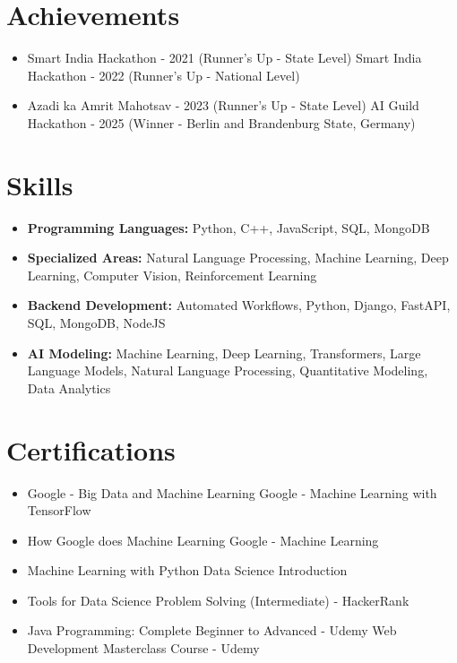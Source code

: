 \documentclass[a4paper,10pt]{article}
\begin{document}
\section*{Achievements}
\begin{itemize}
\item Smart India Hackathon - 2021 (Runner's Up - State Level) \hfill Smart India Hackathon - 2022 (Runner's Up - National Level)
\item Azadi ka Amrit Mahotsav - 2023 (Runner's Up - State Level) \hfill AI Guild Hackathon - 2025 (Winner - Berlin and Brandenburg State, Germany)
\end{itemize}

\section*{Skills}
\begin{itemize}
  \item \textbf{Programming Languages:} Python, C++, JavaScript, SQL, MongoDB
  \item \textbf{Specialized Areas:} Natural Language Processing, Machine Learning, Deep Learning, Computer Vision, Reinforcement Learning
  \item \textbf{Backend Development:} Automated Workflows, Python, Django, FastAPI, SQL, MongoDB, NodeJS
  \item \textbf{AI Modeling:} Machine Learning, Deep Learning, Transformers, Large Language Models, Natural Language Processing, Quantitative Modeling, Data Analytics
\end{itemize}

\section*{Certifications}
\begin{itemize}
\item Google - Big Data and Machine Learning \hfill Google - Machine Learning with TensorFlow
\item How Google does Machine Learning \hfill Google - Machine Learning
\item Machine Learning with Python \hfill Data Science Introduction
\item Tools for Data Science \hfill Problem Solving (Intermediate) - HackerRank
\item Java Programming: Complete Beginner to Advanced - Udemy \hfill Web Development Masterclass Course - Udemy
\end{itemize}
\end{document}

